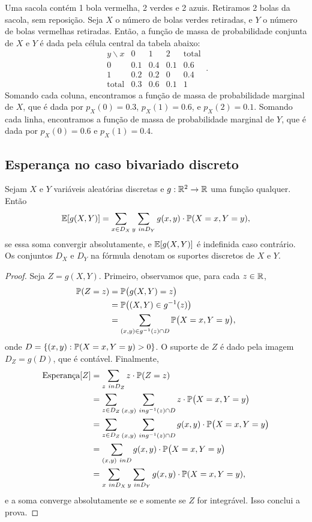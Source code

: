 \begin{example}
Uma sacola contém 1 bola vermelha, 2 verdes e 2 azuis. Retiramos 2 bolas da sacola, sem reposição.
Seja $ X $ o número de bolas verdes retiradas, e $ Y $ o número de bolas vermelhas retiradas.
Então, a função de massa de probabilidade conjunta de $ X $ e $ Y $ é dada pela célula central da tabela abaixo:
\[
\begin{array}{r|rrr|r}
y \backslash x	&	0	&	1	&	2	&	\text{total}
\\ \hline								
0	&	0.1	&	0.4	&	0.1	&	0.6
\\								
1	&	0.2	&	0.2	&	0	&	0.4
\\ \hline								
\text{total}&	0.3	&	0.6	&	0.1	&	1
\end{array}
\ .
\]
Somando cada coluna, encontramos a função de massa de probabilidade marginal de $ X $, que é dada por
$ p_X(0)=0.3 $,
$ p_X(1)=0.6 $,
e
$ p_X(2)=0.1 $.
Somando cada linha, encontramos a função de massa de probabilidade marginal de $ Y $, que é dada por
$ p_X(0)=0.6 $
e
$ p_X(1)=0.4 $.
\end{example}


\subsection{Esperança no caso bivariado discreto}

\begin{proposition}
\label{prop:bivexp}
Sejam $ X $ e $ Y $ variáveis aleatórias discretas e $ g:\mathbb{R}^2 \to \mathbb{R} $ uma função qualquer.
Então
\[
\mathbb{E}[g(X,Y)] = \sum_{x \in D_X } \sum_{y \ in D_Y} g(x,y) \cdot \mathbb{P}(X=x,Y=y),
\]
se essa soma convergir absolutamente, e $ \mathbb{E}[g(X,Y)] $ é indefinida caso contrário.
Os conjuntos $ D_X $ e $ D_Y $ na fórmula denotam os suportes discretos de $ X $ e $ Y$.
\end{proposition}
\begin{proof}
Seja $ Z = g(X,Y) $.
Primeiro, observamos que, para cada $ z \in \mathbb{R} $,
\begin{align}
\mathbb{P}(Z=z)
& = \mathbb{P}\big( g(X,Y)= z\big)
\\
& = \mathbb{P}\big( (X,Y) \in g^{-1}(z) \big)
\\
& = \sum_{(x,y) \in g^{-1}(z) \cap D} \mathbb{P}\big( X=x, Y=y \big)
,
\end{align}
onde $ D = \{(x,y):\mathbb{P}(X=x,Y=y)>0\} $.
O suporte de $ Z $ é dado pela imagem $ D_Z = g(D) $, que é contável.
Finalmente,
\begin{align}
\text{Esperança}[Z]
&
=
\sum_{z \ in D_Z} z \cdot \mathbb{P}(Z=z)
\\
&
=
\sum_{z \in D_Z}
\sum_{(x,y) \ in g^{-1}(z)\cap D}
z \cdot \mathbb{P}\big( X=x, Y=y \big)
\\
&
=
\sum_{z \in D_Z}
\sum_{(x,y) \ in g^{-1}(z)\cap D}
g(x,y) \cdot \mathbb{P}\big( X=x, Y=y \big)
\\
&
=
\sum_{(x,y) \ in D}
g(x,y) \cdot \mathbb{P}\big( X=x, Y=y \big)
\\
&
=
\sum_{x \ in D_X } \sum_{y \ in D_Y} g(x,y) \cdot \mathbb{P}(X=x,Y=y)
,
\end{align}
e a soma converge absolutamente se e somente se $ Z $ for integrável.
Isso conclui a prova.
\end{proof}

